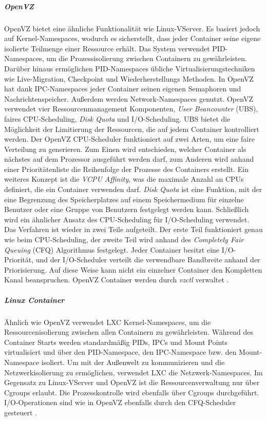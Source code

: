 \subparagraph{OpenVZ}
OpenVZ bietet eine ähnliche Funktionalität wie Linux-VServer. Es basiert jedoch auf Kernel-Namespaces, wodurch es sicherstellt, dass jeder Container seine eigene isolierte Teilmenge einer Ressource erhält. Das System verwendet PID-Namespaces, um die Prozessisolierung zwischen Containern zu gewährleisten. Darüber hinaus ermöglichen PID-Namespaces übliche Virtualisierungstechniken wie Live-Migration, Checkpoint und Wiederherstellungs Methoden. In OpenVZ hat dank IPC-Namespaces jeder Container seinen eigenen Semaphoren und Nachrichtenspeicher. Außerdem werden Network-Namespaces genutzt. OpenVZ verwendet vier Ressourcenmanagement Komponenten, \emph{User Beancounter} (UBS), faires CPU-Scheduling, \emph{Disk Quota} und I/O-Scheduling. UBS bietet die Möglichkeit der Limitierung der Ressourcen, die auf jedem Container kontrolliert werden. Der OpenVZ CPU-Scheduler funktioniert auf zwei Arten, um eine faire Verteilung zu generieren. Zum Einen wird entschieden, welcher Container als nächstes auf dem Prozessor ausgeführt werden darf, zum Anderen wird anhand einer Prioritätenliste die Reihenfolge der Prozesse des Containers erstellt. Ein weiteres Konzept ist die \emph{VCPU Affinity}, was die maximale Anzahl an CPUs definiert, die ein Container verwenden darf. \emph{Disk Quota} ist eine Funktion, mit der eine Begrenzung des Speicherplatzes auf einem Speichermedium für einzelne Benutzer oder eine Gruppe von Benutzern festgelegt werden kann. Schließlich wird ein ähnlicher Ansatz des CPU-Scheduling für I/O-Scheduling verwendet. Das Verfahren ist wieder in zwei Teile aufgeteilt. Der erste Teil funktioniert genau wie beim CPU-Scheduling, der zweite Teil wird anhand des \emph{Completely Fair Queuing} (CFQ) Algorithmus festgelegt. Jeder Container besitzt eine I/O-Priorität, und der I/O-Scheduler verteilt die verwendbare Bandbreite anhand der Priorisierung. Auf diese Weise kann nicht ein einzelner Container den Kompletten Kanal beanspruchen. OpenVZ Container werden durch \emph{vzctl} \cite{ParallelsIPHoldingsGMbH2018Vzctl} verwaltet \cite{IndexOpenvz.org} \cite{Xavier2015AClouds}.

\subparagraph{Linux Container}
Ähnlich wie OpenVZ verwendet LXC Kernel-Namespaces, um die Ressourcenisolierung zwischen allen Containern zu gewährleisten. Während des Container Starts werden standardmäßig PIDs, IPCs und Mount Points virtualisiert und über den PID-Namespace, den IPC-Namespace bzw. den Mount-Namespace isoliert. Um mit der Außenwelt zu kommunizieren und die Netzwerkisolierung zu ermöglichen, verwendet LXC die Netzwerk-Namespaces. Im Gegensatz zu Linux-VServer und OpenVZ ist die Ressourcenverwaltung nur über Cgroups erlaubt. Die Prozesskontrolle wird ebenfalls über Cgroups durchgeführt. I/O-Operationen sind wie in OpenVZ ebenfalls durch den CFQ-Scheduler gesteuert \cite{IndexLinuxcontainers.Org} \cite{Xavier2015AClouds}.

